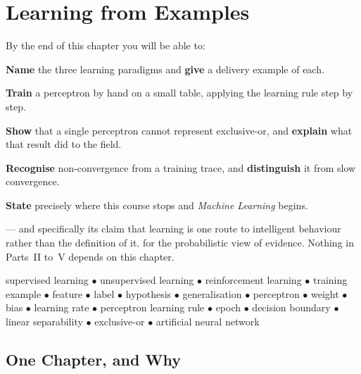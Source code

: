 \chapter{Learning from Examples}\label{ch:learning}

\begin{outcomes}
By the end of this chapter you will be able to:
\begin{tight}
  \item \textbf{Name} the three learning paradigms and \textbf{give} a delivery
        example of each.
  \item \textbf{Train} a perceptron by hand on a small table, applying the learning
        rule step by step.
  \item \textbf{Show} that a single perceptron cannot represent exclusive-or, and
        \textbf{explain} what that result did to the field.
  \item \textbf{Recognise} non-convergence from a training trace, and
        \textbf{distinguish} it from slow convergence.
  \item \textbf{State} precisely where this course stops and \emph{Machine
        Learning} begins.
\end{tight}
\end{outcomes}

\begin{prereq}
 --- and specifically its claim that learning is one route to
intelligent behaviour rather than the definition of it.  for the
probabilistic view of evidence. Nothing in Parts~II to~V depends on this chapter.
\end{prereq}

\begin{keyterms}
supervised learning $\bullet$ unsupervised learning $\bullet$ reinforcement learning
$\bullet$ training example $\bullet$ feature $\bullet$ label $\bullet$ hypothesis
$\bullet$ generalisation $\bullet$ perceptron $\bullet$ weight $\bullet$ bias
$\bullet$ learning rate $\bullet$ perceptron learning rule $\bullet$ epoch $\bullet$
decision boundary $\bullet$ linear separability $\bullet$ exclusive-or $\bullet$
artificial neural network
\end{keyterms}

\section{One Chapter, and Why}

